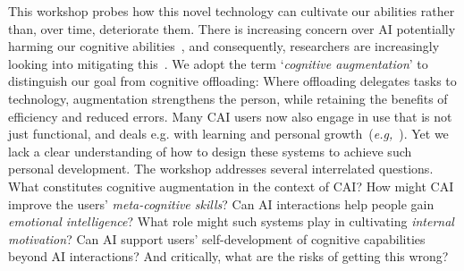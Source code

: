 \documentclass[manuscript,screen,review]{acmart}
\begin{document}
This workshop probes how this novel technology can cultivate our abilities rather than, over time, deteriorate them. There is increasing concern over AI potentially harming our cognitive abilities~\cite{yourbrainongpt25}, and consequently, researchers are increasingly looking into mitigating this~\cite{yatani2024aiextrahericsfosteringhigherorder}.
We adopt the term `\textit{cognitive augmentation}' to distinguish our goal from cognitive offloading: Where offloading delegates tasks to technology, augmentation strengthens the person, while retaining the benefits of efficiency and reduced errors.
Many CAI users now also engage in use that is not just functional, and deals e.g. with learning and personal growth~(\textit{e.g,}~\cite{Wester2025SelfCare, Skjuve2021}). Yet we lack a clear understanding of how to design these systems to achieve such personal development. 
The workshop addresses several interrelated questions. What constitutes cognitive augmentation in the context of CAI? How might CAI improve the users' \textit{meta-cognitive skills}? Can AI interactions help people gain \textit{emotional intelligence}? What role might such systems play in cultivating \textit{internal motivation}? Can AI support users' self-development of cognitive capabilities beyond AI interactions? And critically, what are the risks of getting this wrong?
\end{document}
